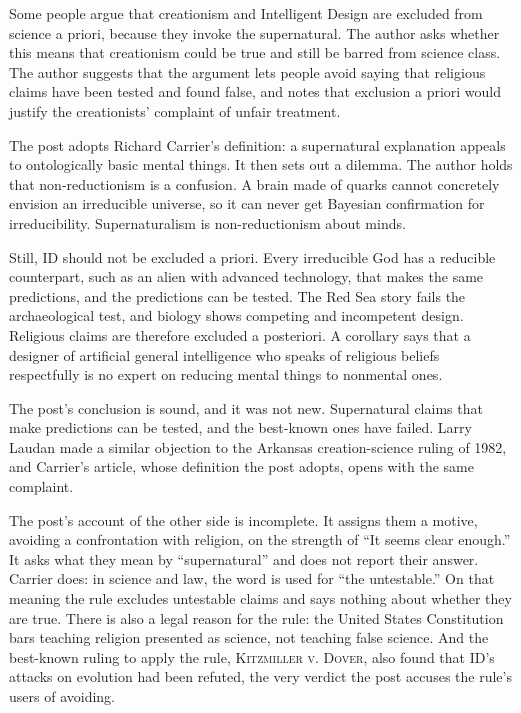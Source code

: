 \begin{afterword}
\summaryhead

Some people argue that creationism and Intelligent Design are excluded from science a priori, because they invoke the supernatural. The author asks whether this means that creationism could be true and still be barred from science class. The author suggests that the argument lets people avoid saying that religious claims have been tested and found false, and notes that exclusion a priori would justify the creationists' complaint of unfair treatment.

The post adopts Richard Carrier's definition: a supernatural explanation appeals to ontologically basic mental things. It then sets out a dilemma. The author holds that non-reductionism is a confusion. A brain made of quarks cannot concretely envision an irreducible universe, so it can never get Bayesian confirmation for irreducibility. Supernaturalism is non-reductionism about minds.

Still, ID should not be excluded a priori. Every irreducible God has a reducible counterpart, such as an alien with advanced technology, that makes the same predictions, and the predictions can be tested. The Red Sea story fails the archaeological test, and biology shows competing and incompetent design. Religious claims are therefore excluded a posteriori. A corollary says that a designer of artificial general intelligence who speaks of religious beliefs respectfully is no expert on reducing mental things to nonmental ones.

\responsehead

The post's conclusion is sound, and it was not new. Supernatural claims that make predictions can be tested, and the best-known ones have failed. Larry Laudan made a similar objection to the Arkansas creation-science ruling of 1982, and Carrier's article, whose definition the post adopts, opens with the same complaint.

The post's account of the other side is incomplete. It assigns them a motive, avoiding a confrontation with religion, on the strength of ``It seems clear enough.'' It asks what they mean by ``supernatural'' and does not report their answer. Carrier does: in science and law, the word is used for ``the untestable.'' On that meaning the rule excludes untestable claims and says nothing about whether they are true. There is also a legal reason for the rule: the United States Constitution bars teaching religion presented as science, not teaching false science. And the best-known ruling to apply the rule, \textsc{Kitzmiller v. Dover}, also found that ID's attacks on evolution had been refuted, the very verdict the post accuses the rule's users of avoiding.


\end{afterword}
